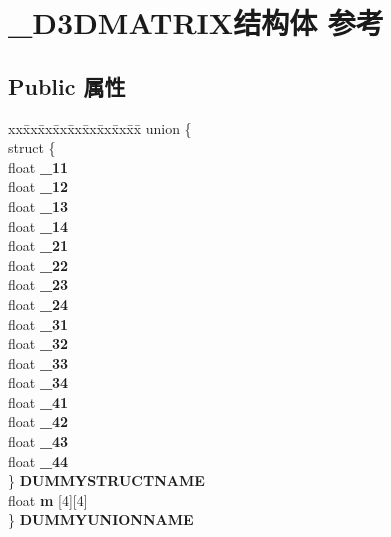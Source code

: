 \hypertarget{struct___d3_d_m_a_t_r_i_x}{}\section{\+\_\+\+D3\+D\+M\+A\+T\+R\+I\+X结构体 参考}
\label{struct___d3_d_m_a_t_r_i_x}
\subsection*{Public 属性}
\begin{DoxyCompactItemize}
\item 
\mbox{\label{struct___d3_d_m_a_t_r_i_x_ae226bb91b409b9bedd3d8ec7316b529e}} 
\begin{tabbing}
xx\=xx\=xx\=xx\=xx\=xx\=xx\=xx\=xx\=\kill
union \{\\
\>struct \{\\
\>\>float {\bfseries \_11}\\
\>\>float {\bfseries \_12}\\
\>\>float {\bfseries \_13}\\
\>\>float {\bfseries \_14}\\
\>\>float {\bfseries \_21}\\
\>\>float {\bfseries \_22}\\
\>\>float {\bfseries \_23}\\
\>\>float {\bfseries \_24}\\
\>\>float {\bfseries \_31}\\
\>\>float {\bfseries \_32}\\
\>\>float {\bfseries \_33}\\
\>\>float {\bfseries \_34}\\
\>\>float {\bfseries \_41}\\
\>\>float {\bfseries \_42}\\
\>\>float {\bfseries \_43}\\
\>\>float {\bfseries \_44}\\
\>\} {\bfseries DUMMYSTRUCTNAME}\\
\>float {\bfseries m} \mbox{[}4\mbox{]}\mbox{[}4\mbox{]}\\
\} {\bfseries DUMMYUNIONNAME}\\


\end{tabbing}
\end{DoxyCompactItemize}
